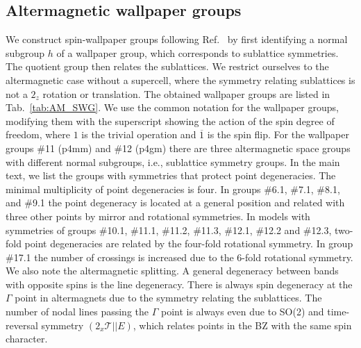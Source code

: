\documentclass[aps,preprintnumbers,amsmath,amssymb]{revtex4-2}
\begin{document}
\subsection{Altermagnetic wallpaper groups}\label{altermagnetic_WP_appendix}
We construct spin-wallpaper groups following Ref.\ \cite{jiang2023enumeration} by first identifying a normal subgroup $h$ of a wallpaper group, which corresponds to sublattice symmetries. The quotient group then relates the sublattices. 
We restrict ourselves to the altermagnetic case without a supercell, where the symmetry relating sublattices is not a $2_z$ rotation or translation. The obtained wallpaper groups are listed in Tab.~\ref{tab:AM_SWG}. We use the common notation for the wallpaper groups, modifying them with the superscript showing the action of the spin degree of freedom, where $1$ is the trivial operation and $\overline{1}$ is the spin flip. 
For the wallpaper groups \#11 (p4mm) and \#12 (p4gm) there are three altermagnetic space groups with different normal subgroups, i.e., sublattice symmetry groups. 
In the main text, we list the groups with symmetries that protect point degeneracies. The minimal multiplicity of point degeneracies is four. In groups \#6.1, \#7.1, \#8.1, and \#9.1 the point degeneracy is located at a general position and related with three other points by mirror and rotational symmetries. In models with symmetries of groups \#10.1, \#11.1, \#11.2, \#11.3, \#12.1, \#12.2 and \#12.3, two-fold point degeneracies are related by the four-fold rotational symmetry. In group \#17.1 the number of crossings is increased due to the 6-fold rotational symmetry. We also note the altermagnetic splitting. A general degeneracy between bands with opposite spins is the line degeneracy. There is always spin degeneracy at the $\Gamma$ point in altermagnets due to the symmetry relating the sublattices. The number of nodal lines passing the $\Gamma$ point is always even due to SO(2) and time-reversal symmetry $(2_x\mathcal{T}||E)$, which relates points in the BZ with the same spin character.
\end{document}
